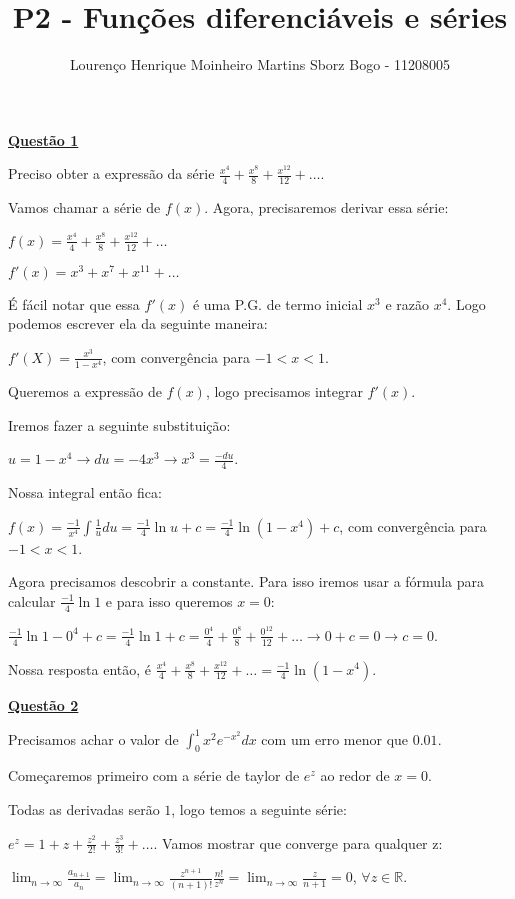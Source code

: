 \documentclass[12pt]{article}
\title{P2 - Funções diferenciáveis e séries}
\author{Lourenço Henrique Moinheiro Martins Sborz Bogo - 11208005}
\date{}
\newcommand{\real}{\mathbb{R}}
\newcommand{\mytitle}[1]{\textbf{\underline{#1}}}
\begin{document}
\maketitle

\mytitle{Questão 1}

Preciso obter a expressão da série $\frac{x^4}{4} + \frac{x^8}{8} + \frac{x^{12}}{12} + \dots$.

Vamos chamar a série de $f(x)$. Agora, precisaremos derivar essa série:

$f(x) = \frac{x^4}{4} + \frac{x^8}{8} + \frac{x^{12}}{12} + \dots$

$f'(x) = x^3 + x^7 + x^{11} + \dots$

É fácil notar que essa $f'(x)$ é uma P.G. de termo inicial $x^3$ e razão $x^4$. Logo podemos escrever ela da seguinte maneira:

$f'(X) = \frac{x^3}{1-x^4}$, com convergência para $-1<x<1$.

Queremos a expressão de $f(x)$, logo precisamos integrar $f'(x)$.

Iremos fazer a seguinte substituição:

$u = 1-x^4 \rightarrow du = -4x^3 \rightarrow x^3 = \frac{-du}{4}$.

Nossa integral então fica:

$f(x) = \frac{-1}{x^4}\int\frac{1}{u}du = \frac{-1}{4}\ln{u}+c = \frac{-1}{4}\ln{(1-x^4)}+c$, com convergência para $-1<x<1$.

Agora precisamos descobrir a constante. Para isso iremos usar a fórmula para calcular $\frac{-1}{4}\ln{1}$ e para isso queremos $x = 0$:

$\frac{-1}{4}\ln{1 - 0^4}+c= \frac{-1}{4}\ln{1}+c= \frac{0^4}{4} + \frac{0^8}{8} + \frac{0^{12}}{12} + \dots \rightarrow 0+c = 0 \rightarrow c = 0$.

Nossa resposta então, é $\frac{x^4}{4} + \frac{x^8}{8} + \frac{x^{12}}{12} + \dots = \frac{-1}{4}\ln{(1-x^4)}$.

\mytitle{Questão 2}

Precisamos achar o valor de $\int_0^1x^2e^{-x^2}dx$ com um erro menor que $0.01$.

Começaremos primeiro com a série de taylor de $e^z$ ao redor de $x=0$.

Todas as derivadas serão $1$, logo temos a seguinte série:

$e^z = 1+z+\frac{z^2}{2!}+\frac{z^3}{3!} + \dots$. Vamos mostrar que converge para qualquer z:

$\displaystyle\lim_{n \to \infty}\frac{a_{n+1}}{a_n} = \lim_{n \to \infty}\frac{z^{n+1}}{(n+1)!}\frac{n!}{z^n} = \lim_{n \to \infty}\frac{z}{n+1} = 0$, $\forall z \in \real$.
\end{document}
